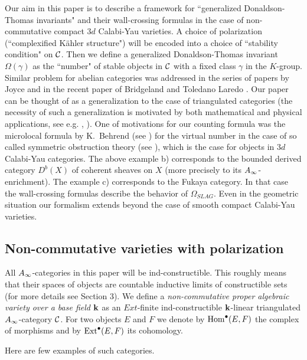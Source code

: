 \documentclass[12pt]{article}
\begin{document}
Our aim in this paper is to describe a framework for ``generalized Donaldson-Thomas invariants" and their wall-crossing formulas in the case
of non-commutative compact $3d$ Calabi-Yau varieties.
A choice of polarization
(``complexified K\"ahler structure")
will be encoded into a choice of ``stability condition" on ${\cal C}$. Then we define a generalized Donaldson-Thomas invariant $\Omega(\gamma)$  as  the
``number" of stable  objects in ${\cal C}$ with a fixed class $\gamma$ in the $K$-group.
Similar problem for abelian categories was addressed in the series of papers by Joyce  \cite{Jo1}\cite{Jo2}\cite{Jo3}
 and in the recent paper of Bridgeland and Toledano Laredo \cite{BrTL}. Our paper can be thought of as a generalization to the case of triangulated categories (the necessity of such a generalization is motivated by both mathematical and physical applications,
see e.g. \cite{T1}, \cite{Dou}). One of motivations for our counting formula was the microlocal formula by K.~Behrend (see
 \cite{B}) for the virtual number in the case of so called symmetric obstruction theory (see \cite{BF}), which is the
 case for objects in $3d$ Calabi-Yau categories. 
The above example b) corresponds to the bounded derived category $D^b(X)$ of coherent sheaves on $X$ (more precisely to its $A_{\infty}$-enrichment). The example c) corresponds to the Fukaya category. In that case the wall-crossing formulas describe the behavior of
$\Omega_{SLAG}$. Even in the geometric situation our formalism extends beyond the case of smooth compact Calabi-Yau varieties.





\subsection{Non-commutative  varieties with polarization}

All $A_{\infty}$-categories in this paper will be ind-constructible. This roughly means that their spaces of objects are countable inductive limits of constructible sets (for more details see  Section 3).
We define a {\it non-commutative proper algebraic variety over a base field ${\bf k}$} as an $Ext$-finite ind-constructible ${\bf k}$-linear triangulated $A_{\infty}$-category ${\mathcal C}$. For two objects
$E$ and $F$  we denote by $\operatorname{Hom}^{\bullet}(E,F)$ the complex of morphisms and by
$\operatorname{Ext}^{\bullet}(E,F)$ its cohomology.

Here are few examples of such categories.
\end{document}
